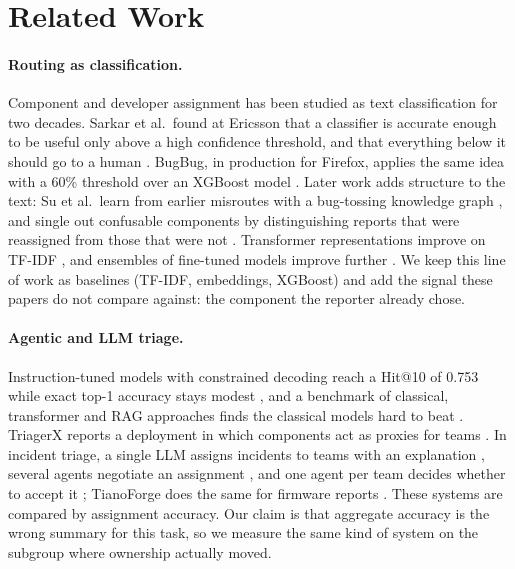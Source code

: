 \documentclass[sigconf,anonymous]{acmart}
\begin{document}
\section{Related Work}
\label{sec:related}


\paragraph{Routing as classification.}
Component and developer assignment has been studied as text classification for two decades.
Sarkar et al.\ found at Ericsson that a classifier is accurate enough to be useful only above a
high confidence threshold, and that everything below it should go to a human
\cite{sarkar2019ericsson}. BugBug, in production for Firefox, applies the same idea with a 60\%
threshold over an XGBoost model \cite{castelluccio2019bugbug}. Later work adds structure to the
text: Su et al.\ learn from earlier misroutes with a bug-tossing knowledge graph
\cite{su2021bugtossing}, and single out confusable components by distinguishing reports that were
reassigned from those that were not \cite{su2023stillconfusing}. Transformer representations
improve on TF-IDF \cite{dipongkor2023comparative}, and ensembles of fine-tuned models improve
further \cite{dipongkor2024ensemble}. We keep this line of work as baselines (TF-IDF, embeddings,
XGBoost) and add the signal these papers do not compare against: the component the reporter
already chose.

\paragraph{Agentic and LLM triage.}
Instruction-tuned models with constrained decoding reach a Hit@10 of 0.753 while exact top-1
accuracy stays modest \cite{kiashemshaki2025instruction}, and a benchmark of classical,
transformer and RAG approaches finds the classical models hard to beat
\cite{lajko2026benchmarking}. TriagerX reports a deployment in which components act as proxies for
teams \cite{mamun2026triagerx}. In incident triage, a single LLM assigns incidents to teams with an
explanation \cite{wang2024comet}, several agents negotiate an assignment \cite{yu2025triangle}, and
one agent per team decides whether to accept it \cite{yao2026agentic}; TianoForge does the same for
firmware reports \cite{siavash2026tianoforge}. These systems are compared by assignment accuracy.
Our claim is that aggregate accuracy is the wrong summary for this task, so we measure the same
kind of system on the subgroup where ownership actually moved.
\end{document}
